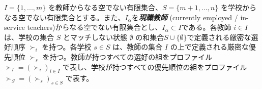 \documentclass[12pt, a4paper]{article}
\theoremstyle{definition}
\theoremstyle{remark}
\theoremstyle{plain}
\begin{document}







$I = \{1, ..., m\}$ を教師からなる空でない有限集合、$S = \{m+1, ..., n\}$ を学校からなる空でない有限集合とする。また、$I_{\alpha}$を\textbf{\textit{現職教師}} (currently employed / in-service teachers)からなる空でない有限集合とし、$I_{\alpha} \subset I$である。各教師 $i \in I$ は、学校の集合 $S$ とマッチしない状態 $\emptyset$ の和集合$S \cup \{ \emptyset \}$で定義される厳密な選好順序 $\succ_i$ を持つ。各学校 $s \in S$ は、教師の集合 $I$ の上で定義される厳密な優先順位 $\succ_s$ を持つ。教師が持つすべての選好の組をプロファイル $\succ_I = (\succ_i)_{i \in I}$ で表し、学校が持つすべての優先順位の組をプロファイル $\succ_S = (\succ_s)_{s \in S}$ で表す。
\end{document}
